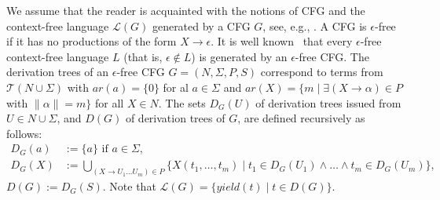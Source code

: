 \documentclass[preprint,12pt,english]{article}
\def\cL{\mathcal{L}}
\def\cT{\mathcal{T}}
\def\Ra{\Rightarrow}
\newcommand\comment[1]{}
\begin{document}
\comment{
A {\em context-free grammar} (CFG) is a quadruple $G=(N,\Sigma,P,S)$ where: $N$ is a finite set of {\em nonterminals}; $\Sigma$ is a finite set of {\em terminals}; $P$ is a finite set of {\em productions}  $X\to\alpha$ with $X\in N$ and $\alpha\in (N\cup \Sigma)^*$; and $S\in N$ is a special nonterminal called the {\em start symbol}.  Such a CFG induces a {\em derivation relation} $\Ra_G$ on the set of finite strings $(N\cup \Sigma)^*$, defined by $\alpha_1X\alpha_2\Ra_G\alpha_1\alpha\alpha_2$ whenever  $\alpha_1,\alpha_2\in (N\cup \Sigma)^*$ and $(X\to\alpha)\in P.$ The {\em language generated} by $G$ is $\cL(G):=\{\alpha\in \Sigma^*\mid S\Ra_G^* \alpha\}$, where $\Ra^*_G$ is the reflexive and transitive closure of $\Ra_G$. A {\em context-free language} is a language generated by a CFG.}
We assume that the reader is acquainted with the notions of CFG and the context-free language $\cL(G)$ generated by a CFG $G$, see, e.g., \cite{Sipser:2006}.
A CFG is $\epsilon$-free if it has no productions of the form $X\to\epsilon$. It is well known~\cite{Hopcroft:2003} that every $\epsilon$-free context-free language $L$ (that is, $\epsilon\not\in L$) is generated by an $\epsilon$-free CFG. 
The derivation trees of an $\epsilon$-free CFG $G=(N,\Sigma,P,S)$  correspond to terms from $\cT(N\cup \Sigma)$ with $ar(a)=\{0\}$ for al $a\in\Sigma$ and $ar(X)=\{m\mid \exists (X\to \alpha)\in P$ with $\|\alpha\|=m\}$ for all $X\in N$. The sets $D_G(U)$ of derivation trees  issued from $U\in N\cup \Sigma$, and $D(G)$ of derivation trees of $G$, are defined recursively as follows:
\begin{align*}
 D_G(a)&:=\{a\}\text{ if }a\in \Sigma,\\
D_G(X)&:=\bigcup_{(X\to U_1\ldots U_m)\in P}\{X(t_1,\ldots,t_m)\mid t_1\in D_G(U_1)\wedge\ldots\wedge t_m\in D_G(U_m)\},
\end{align*}
$D(G):=D_G(S).$ Note that $\cL(G)=\{yield(t)\mid t\in D(G)\}.$
\end{document}
